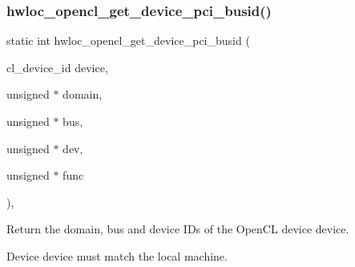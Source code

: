 \subsubsection{\texorpdfstring{hwloc\+\_\+opencl\+\_\+get\+\_\+device\+\_\+pci\+\_\+busid()}{hwloc\_opencl\_get\_device\_pci\_busid()}}
{\footnotesize\ttfamily static int hwloc\+\_\+opencl\+\_\+get\+\_\+device\+\_\+pci\+\_\+busid (\begin{DoxyParamCaption}\item[{cl\+\_\+device\+\_\+id}]{device,  }\item[{unsigned $\ast$}]{domain,  }\item[{unsigned $\ast$}]{bus,  }\item[{unsigned $\ast$}]{dev,  }\item[{unsigned $\ast$}]{func }\end{DoxyParamCaption})\hspace{0.3cm}{\ttfamily [inline]}, {\ttfamily [static]}}



Return the domain, bus and device I\+Ds of the Open\+CL device {\ttfamily device}. 

Device {\ttfamily device} must match the local machine. 